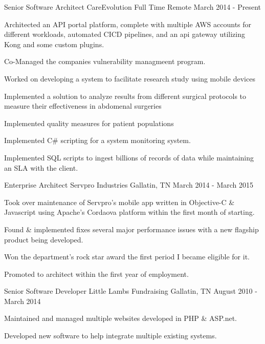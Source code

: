 \begin{cventries}
  \cventry
    {Senior Software Architect}
    {CareEvolution}
    {Full Time Remote}
    {March 2014 - Present}
    {
      \begin{cvitems}
        \item {Architected an API portal platform, complete with multiple AWS accounts for different workloads, automated CICD pipelines, and an api gateway utilizing Kong and some custom plugins.}
      	\item {Co-Managed the companies vulnerability managmeent program.}
        \item {Worked on developing a system to facilitate research study using mobile devices}
      	\item {Implemented a solution to analyze results from different surgical protocols to measure their effectiveness in abdomenal surgeries}
      	\item {Implemented quality measures for patient populations}
        \item {Implemented C\# scripting for a system monitoring system.}
        \item {Implemented SQL scripts to ingest billions of records of data while maintaining an SLA with the client.}
      \end{cvitems}
    }
  \cventry
    {Enterprise Architect}
    {Servpro Industries}
    {Gallatin, TN}
    {March 2014 - March 2015}
    {
      \begin{cvitems}
        \item {Took over maintenance of Servpro's mobile app written in Objective-C \& Javascript using Apache's Cordaova platform within the first month of starting.}
        \item {Found \& implemented fixes several major performance issues with a new flagship product being developed.}
        \item {Won the department's rock star award the first period I became eligible for it.}
        \item {Promoted to architect within the first year of employment.}
      \end{cvitems}
    }
  \cventry
    {Senior Software Developer}
    {Little Lambs Fundraising}
    {Gallatin, TN}
    {August 2010 - March 2014}
    {
      \begin{cvitems}
        \item {Maintained and managed multiple websites developed in PHP \& ASP.net.}
        \item {Developed new software to help integrate multiple existing systems.}

\end{cvitems}}
\end{cventries}
